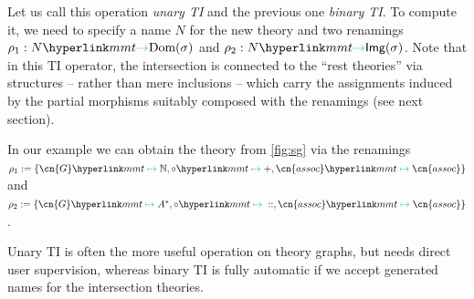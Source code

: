 Let us call this operation \emph{unary TI} and the previous one \emph{binary TI}. To compute it, we need to specify a name $N$ for the new theory and two renamings
$\rho_1:\viewto N{\Domain\sigma}$ and
$\rho_2:\viewto N{\textsf{Img}(\sigma)}$. Note that in
this TI operator, the intersection is connected to the ``rest theories'' via \mmt
structures -- rather than mere inclusions -- which carry the assignments induced by the
partial morphisms suitably composed with the renamings (see next section).

In our example we can obtain the theory  from \autoref{fig:sg} via the renamings
$\rho_1:=\{\cn{G}\mmtass\mathbb{N},\circ\mmtass+,\cn{assoc}\mmtass\cn{assoc}\}$ and
$\rho_2:=\{\cn{G}\mmtass A^*,\circ\mmtass\conc,\cn{assoc}\mmtass\cn{assoc}\}$.

Unary TI is often the more useful operation on theory graphs, but needs direct user
supervision, whereas binary TI is fully automatic if we accept generated names for the
intersection theories.
